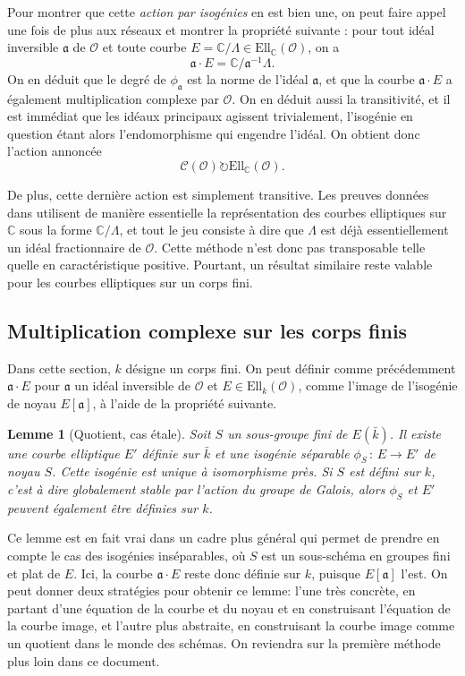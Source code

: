 \documentclass[11pt,a4paper]{article}
\newcommand{\C}{\mathbb{C}}
\renewcommand{\O}{\mathcal{O}}
\newcommand{\Cl}{\mathcal{C}}
\newcommand{\vers}{\longrightarrow}
\newcommand{\Ell}{\mathrm{Ell}}
\renewcommand{\frak}{\mathfrak}
\newcommand{\de}{\,:\,}
\renewcommand{\v}{\vspace{5mm}}
\newtheorem*{lem}{Lemme}
\theoremstyle{definition}
\begin{document}
\v

Pour montrer que cette \emph{action par isogénies} en est bien une, on peut faire appel une fois de plus aux réseaux et montrer la propriété suivante : pour tout idéal inversible $\frak a$ de $\O$ et toute courbe $E=\C/\Lambda\in \Ell_\C(\O)$, on a
$$\frak a\cdot E = \C/\frak a^{-1} \Lambda.$$
On en déduit que le degré de $\phi_{\frak a}$ est la norme de l'idéal $\frak a$, et que la courbe $\frak a\cdot E$ a également multiplication complexe par $\O$. On en déduit aussi la transitivité, et il est immédiat que les idéaux principaux agissent trivialement, l'isogénie en question étant alors l'endomorphisme qui engendre l'idéal. On obtient donc l'action annoncée
$$\Cl(\O) \circlearrowright \Ell_\C(\O).$$

De plus, cette dernière action est simplement transitive. Les preuves données dans \cite{Sil2} utilisent de manière essentielle la représentation des courbes elliptiques sur $\C$ sous la forme $\C/\Lambda$, et tout le jeu consiste à dire que $\Lambda$ est déjà essentiellement un idéal fractionnaire de $\O$. Cette méthode n'est donc pas transposable telle quelle en caractéristique positive. Pourtant, un résultat similaire reste valable pour les courbes elliptiques sur un corps fini.

\subsection{Multiplication complexe sur les corps finis}

 Dans cette section, $k$ désigne un corps fini. On peut définir comme précédemment $\frak a\cdot E$ pour $\frak a$ un idéal inversible de $\O$ et $E\in \Ell_k(\O)$, comme l'image de l'isogénie de noyau $E[\frak a]$, à l'aide de la propriété suivante.

\begin{lem}[Quotient, cas étale] Soit $S$ un sous-groupe fini de $E(\bar{k})$. Il existe une courbe elliptique $E'$ définie sur $\bar{k}$ et une isogénie séparable $\phi_S\de E\vers E'$ de noyau $S$. Cette isogénie est unique à isomorphisme près. Si $S$ est défini sur $k$, c'est à dire globalement stable par l'action du groupe de Galois, alors $\phi_S$ et $E'$ peuvent également être définies sur $k$.
\end{lem} 

Ce lemme est en fait vrai dans un cadre plus général qui permet de prendre en compte le cas des isogénies inséparables, où $S$ est un sous-schéma en groupes fini et plat de $E$. Ici, la courbe $\frak a\cdot E$ reste donc définie sur $k$, puisque $E[\frak a]$ l'est. On peut donner deux stratégies pour obtenir ce lemme: l'une très concrète, en partant d'une équation de la courbe et du noyau et en construisant l'équation de la courbe image, et l'autre plus abstraite, en construisant la courbe image comme un quotient dans le monde des schémas. On reviendra sur la première méthode plus loin dans ce document.
\end{document}
